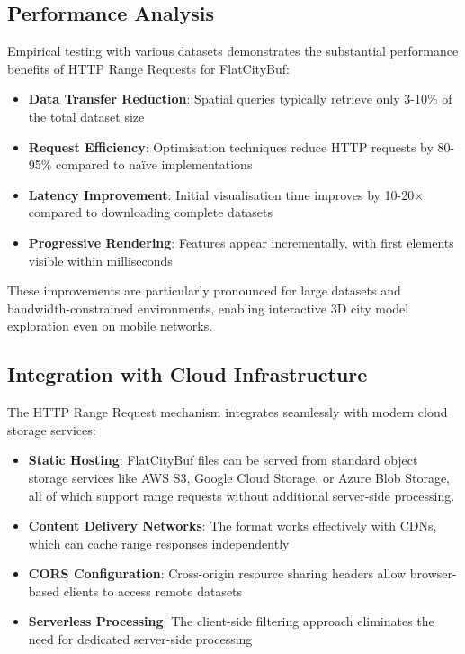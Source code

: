 \subsection{Performance Analysis}
\label{methodology:http_range_requests:performance_analysis}

Empirical testing with various datasets demonstrates the substantial performance benefits of HTTP Range Requests for FlatCityBuf:

\begin{itemize}
    \item \textbf{Data Transfer Reduction}: Spatial queries typically retrieve only 3-10\% of the total dataset size
    \item \textbf{Request Efficiency}: Optimisation techniques reduce HTTP requests by 80-95\% compared to naïve implementations
    \item \textbf{Latency Improvement}: Initial visualisation time improves by 10-20× compared to downloading complete datasets
    \item \textbf{Progressive Rendering}: Features appear incrementally, with first elements visible within milliseconds
\end{itemize}

These improvements are particularly pronounced for large datasets and bandwidth-constrained environments, enabling interactive 3D city model exploration even on mobile networks.

\subsection{Integration with Cloud Infrastructure}
\label{methodology:http_range_requests:cloud_integration}

The HTTP Range Request mechanism integrates seamlessly with modern cloud storage services:

\begin{itemize}
    \item \textbf{Static Hosting}: FlatCityBuf files can be served from standard object storage services like AWS S3, Google Cloud Storage, or Azure Blob Storage, all of which support range requests without additional server-side processing.

    \item \textbf{Content Delivery Networks}: The format works effectively with CDNs, which can cache range responses independently

    \item \textbf{CORS Configuration}: Cross-origin resource sharing headers allow browser-based clients to access remote datasets

    \item \textbf{Serverless Processing}: The client-side filtering approach eliminates the need for dedicated server-side processing
\end{itemize}

